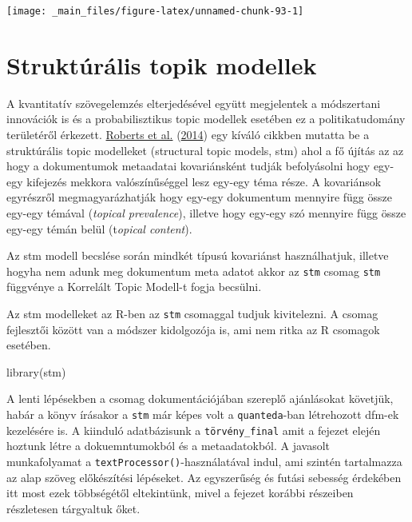 \documentclass[
]{book}
\newenvironment{Shaded}{\begin{snugshade}}{\end{snugshade}}
\newcommand{\FunctionTok}[1]{\textcolor[rgb]{0.00,0.00,0.00}{#1}}
\newcommand{\NormalTok}[1]{#1}
\begin{document}
\begin{center}\texttt{[image: \_main\_files/figure-latex/unnamed-chunk-93-1]} \end{center}

\hypertarget{struktuxfaruxe1lis-topik-modellek}{%
\section{Struktúrális topik
modellek}\label{struktuxfaruxe1lis-topik-modellek}}

A kvantitatív szövegelemzés elterjedésével együtt megjelentek a
módszertani innovációk is és a probabilisztikus topic modellek esetében
ez a politikatudomány területéről érkezett.
\protect\hyperlink{ref-roberts2014structural}{Roberts et al.}
(\protect\hyperlink{ref-roberts2014structural}{2014}) egy kíváló cikkben
mutatta be a struktúrális topic modelleket (structural topic models,
stm) ahol a fő újítás az az hogy a dokumentumok metaadatai kovariánsként
tudják befolyásolni hogy egy-egy kifejezés mekkora valószínűséggel lesz
egy-egy téma része. A kovariánsok egyrészről megmagyarázhatják hogy
egy-egy dokumentum mennyire függ össze egy-egy témával (\emph{topical
prevalence}), illetve hogy egy-egy szó mennyire függ össze egy-egy témán
belül (t\emph{opical content}).

Az stm modell becslése során mindkét típusú kovariánst használhatjuk,
illetve hogyha nem adunk meg dokumentum meta adatot akkor az
\texttt{stm} csomag \texttt{stm} függvénye a Korrelált Topic Modell-t
fogja becsülni.

Az stm modelleket az R-ben az \texttt{stm} csomaggal tudjuk kivitelezni.
A csomag fejlesztői között van a módszer kidolgozója is, ami nem ritka
az R csomagok esetében.

\begin{Shaded}
\begin{Highlighting}[]
\FunctionTok{library}\NormalTok{(stm)}
\end{Highlighting}
\end{Shaded}

A lenti lépésekben a csomag dokumentációjában szereplő ajánlásokat
követjük, habár a könyv írásakor a \texttt{stm} már képes volt a
\texttt{quanteda}-ban létrehozott dfm-ek kezelésére is. A kiinduló
adatbázisunk a \texttt{törvény\_final} amit a fejezet elején hoztunk
létre a dokuemntumokból és a metaadatokból. A javasolt munkafolyamat a
\texttt{textProcessor()}-használatával indul, ami szintén tartalmazza az
alap szöveg előkészítési lépéseket. Az egyszerűség és futási sebesség
érdekében itt most ezek többségétől eltekintünk, mivel a fejezet korábbi
részeiben részletesen tárgyaltuk őket.
\end{document}
